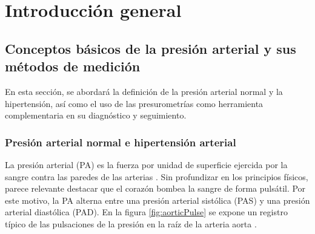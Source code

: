 
\chapter{Introducción general} %

\label{Chapter1} %
\label{IntroGeneral}


\newcommand{\keyword}[1]{\textbf{#1}}
\newcommand{\tabhead}[1]{\textbf{#1}}
\newcommand{\code}[1]{\texttt{#1}}
\newcommand{\file}[1]{\texttt{\bfseries#1}}
\newcommand{\option}[1]{\texttt{\itshape#1}}
\newcommand{\grados}{$^{\circ}$}



\section{Conceptos básicos de la presión arterial y sus métodos de medición}

En esta sección, se abordará la definición de la presión arterial normal y la hipertensión, 
así como el uso de las presurometrías como herramienta complementaria en su diagnóstico y seguimiento.

\subsection{Presión arterial normal e hipertensión arterial}

La presión arterial (PA) es la fuerza por unidad de superficie ejercida por la sangre contra las paredes 
de las arterias \citep{CITE:1}. Sin profundizar en los principios físicos, parece relevante destacar que el corazón 
bombea la sangre de forma pulsátil. Por este motivo, la PA alterna entre una presión arterial sistólica (PAS) 
y una presión arterial diastólica (PAD). En la figura \ref{fig:aorticPulse} se expone un registro típico de las pulsaciones 
de la presión en la raíz de la arteria aorta \citep{CITE:2} \citep{CITE:3}. 

